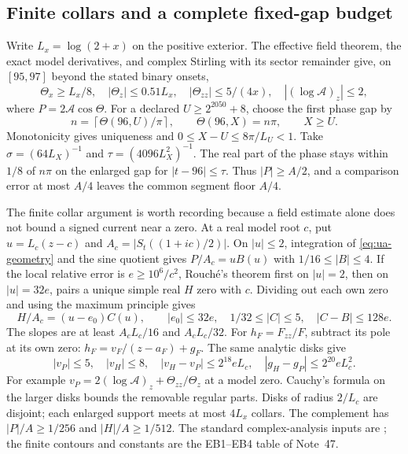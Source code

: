 \subsection{Finite collars and a complete fixed-gap budget}
Write $L_x=\log(2+x)$ on the positive exterior. The effective field
theorem, the exact model derivatives, and complex Stirling with its
sector remainder give, on $[95,97]$ beyond the stated binary onsets,
\begin{equation}
 \Theta_x\ge L_x/8,\quad |\Theta_z|\le0.51L_x,\quad
 |\Theta_{zz}|\le5/(4x),\quad
 |(\log\mathcal A)_z|\le2,
 \label{eq:ua-geometry}
\end{equation}
where $P=2\mathcal A\cos\Theta$. For a declared $U\ge2^{2050}+8$,
choose the first phase gap by
\begin{equation}
 n=\left\lceil\Theta(96,U)/\pi\right\rceil,\qquad
 \Theta(96,X)=n\pi,\qquad X\ge U.
 \label{eq:ua-first-gap}
\end{equation}
Monotonicity gives uniqueness and $0\le X-U\le8\pi/L_U<1$.
Take $\sigma=(64L_X)^{-1}$ and
$\tau=(4096L_X^2)^{-1}$. The real part of the phase stays within
$1/8$ of $n\pi$ on the enlarged gap for $|t-96|\le\tau$.
Thus $|P|\ge A/2$, and a comparison error at most $A/4$ leaves
the common segment floor $A/4$.

The finite collar argument is worth recording because a field estimate
alone does not bound a signed current near a zero. At a real model root
$c$, put $u=L_c(z-c)$ and $A_c=|S_t((1+ic)/2)|$. On $|u|\le2$,
integration of \eqref{eq:ua-geometry} and the sine quotient gives
$P/A_c=uB(u)$ with $1/16\le|B|\le4$. If the local relative error is
$e\ge10^6/c^2$, Rouch\'e's theorem first on $|u|=2$, then on
$|u|=32e$, pairs a unique simple real $H$ zero with $c$.
Dividing out each own zero and using the maximum principle gives
\begin{equation}
 H/A_c=(u-e_0)C(u),\qquad
 |e_0|\le32e,\quad 1/32\le|C|\le5,\quad |C-B|\le128e.
 \label{eq:ua-units}
\end{equation}
The slopes are at least $A_cL_c/16$ and $A_cL_c/32$.
For $h_F=F_{zz}/F$, subtract its pole at its own zero:
$h_F=v_F/(z-a_F)+g_F$. The same analytic disks give
\begin{equation}
 |v_P|\le5,\quad |v_H|\le8,\quad
 |v_H-v_P|\le2^{18}eL_c,\quad
 |g_H-g_P|\le2^{20}eL_c^2.
 \label{eq:ua-poles}
\end{equation}
For example $v_P=2(\log\mathcal A)_z+\Theta_{zz}/\Theta_z$ at a
model zero. Cauchy's formula on the larger disks bounds the removable
regular parts. Disks of radius $2/L_c$ are disjoint; each enlarged
support meets at most $4L_x$ collars. The complement has
$|P|/A\ge1/256$ and $|H|/A\ge1/512$.
The standard complex-analysis inputs are
\cite{DLMF110Coarse2026,DLMFCauchy1931,DLMFGammaOuter2026}; the finite
contours and constants are the EB1--EB4 table of Note~47.


